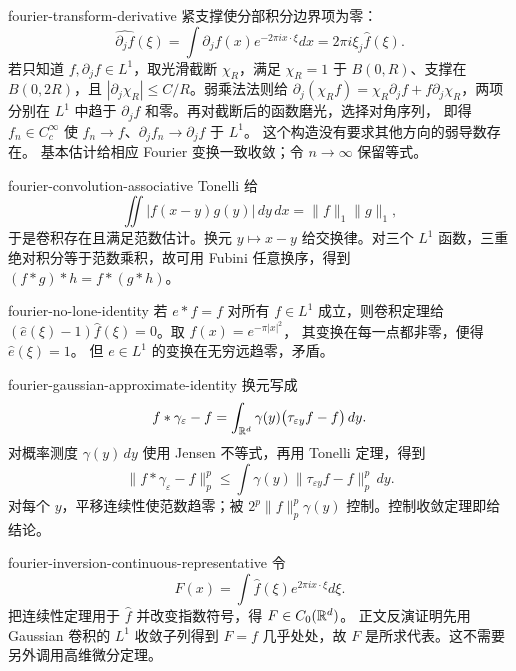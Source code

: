 \begin{solution}{fourier-transform-derivative}
紧支撑使分部积分边界项为零：
\[
 \widehat{\partial_jf}(\xi)
 =\int\partial_jf(x)e^{-2\pi ix\cdot\xi}dx
 =2\pi i\xi_j\widehat f(\xi).
\]
若只知道 \(f,\partial_jf\in L^1\)，取光滑截断 \(\chi_R\)，满足
\(\chi_R=1\) 于 \(B(0,R)\)、支撑在 \(B(0,2R)\)，且
\(|\partial_j\chi_R|\le C/R\)。弱乘法法则给
\(\partial_j(\chi_Rf)=\chi_R\partial_jf+f\partial_j\chi_R\)，两项分别在
\(L^1\) 中趋于 \(\partial_jf\) 和零。再对截断后的函数磨光，选择对角序列，
即得 \(f_n\in C_c^\infty\) 使
\(f_n\to f\)、\(\partial_jf_n\to\partial_jf\) 于 \(L^1\)。
这个构造没有要求其他方向的弱导数存在。
基本估计给相应 Fourier 变换一致收敛；令 \(n\to\infty\) 保留等式。
\end{solution}

\begin{solution}{fourier-convolution-associative}
Tonelli 给
\[
 \iint|f(x-y)g(y)|\,dy\,dx=\|f\|_1\|g\|_1,
\]
于是卷积存在且满足范数估计。换元 \(y\mapsto x-y\) 给交换律。对三个
\(L^1\) 函数，三重绝对积分等于范数乘积，故可用 Fubini 任意换序，得到
\((f*g)*h=f*(g*h)\)。
\end{solution}

\begin{solution}{fourier-no-lone-identity}
若 \(e*f=f\) 对所有 \(f\in L^1\) 成立，则卷积定理给
\((\widehat e(\xi)-1)\widehat f(\xi)=0\)。取 \(f(x)=e^{-\pi|x|^2}\)，
其变换在每一点都非零，便得 \(\widehat e(\xi)=1\)。
但 \(e\in L^1\) 的变换在无穷远趋零，矛盾。
\end{solution}

\begin{solution}{fourier-gaussian-approximate-identity}
换元写成
\[
 f*\gamma_\varepsilon-f
 =\int_{\mathbb{R}^d}\gamma(y)\bigl(\tau_{\varepsilon y}f-f\bigr)\,dy.
\]
对概率测度 \(\gamma(y)\,dy\) 使用 Jensen 不等式，再用 Tonelli 定理，得到
\[
 \|f*\gamma_\varepsilon-f\|_p^p
 \le\int\gamma(y)\|\tau_{\varepsilon y}f-f\|_p^p\,dy.
\]
对每个 \(y\)，平移连续性使范数趋零；被
\(2^p\|f\|_p^p\gamma(y)\) 控制。控制收敛定理即给结论。
\end{solution}

\begin{solution}{fourier-inversion-continuous-representative}
令
\[
 F(x)=\int\widehat f(\xi)e^{2\pi ix\cdot\xi}d\xi.
\]
把连续性定理用于 \(\widehat f\) 并改变指数符号，得 \(F\in C_0(\mathbb{R}^d)\)。
正文反演证明先用 Gaussian 卷积的 \(L^1\) 收敛子列得到
\(F=f\) 几乎处处，故 \(F\) 是所求代表。这不需要另外调用高维微分定理。
\end{solution}

